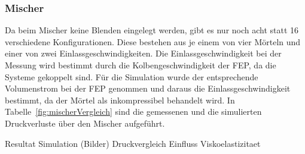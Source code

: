 \subsubsection{Mischer}
Da beim Mischer keine Blenden eingelegt werden, gibt es nur noch acht statt 16 verschiedene Konfigurationen. Diese bestehen aus je einem von vier Mörteln und einer von zwei Einlassgeschwindigkeiten.
Die Einlassgeschwindigkeit bei der Messung wird bestimmt durch die Kolbengeschwindigkeit der FEP, da die Systeme gekoppelt sind. Für die Simulation wurde der entsprechende Volumenstrom bei der FEP genommen und daraus die Einlassgeschwindigkeit bestimmt, da der Mörtel als inkompressibel behandelt wird.
In Tabelle~\ref{fig:mischerVergleich} sind die gemessenen und die simulierten Druckverluste über den Mischer aufgeführt.
%
\begin{table}[tb]
\noindent{}
    \caption{Die gemessenen und simulierten Konfigurationen des Mischers mit den rein scherratenabhängigen Modellen.}
    \label{fig:mischerVergleich}
\end{table}


\begin{todocontent}
    \1 Resultat Simulation (Bilder)
    \1 Druckvergleich
    \1 Einfluss Viskoelastizitaet
\end{todocontent}
